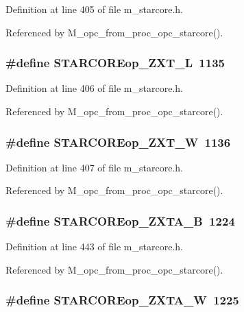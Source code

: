 Definition at line 405 of file m\_\-starcore.h.

Referenced by M\_\-opc\_\-from\_\-proc\_\-opc\_\-starcore().
\subsubsection{\setlength{\rightskip}{0pt plus 5cm}\#define STARCOREop\_\-ZXT\_\-L~1135}\label{m__starcore_8h_f1dd3e02a4b1e13b99f240635fd8c578}




Definition at line 406 of file m\_\-starcore.h.

Referenced by M\_\-opc\_\-from\_\-proc\_\-opc\_\-starcore().
\subsubsection{\setlength{\rightskip}{0pt plus 5cm}\#define STARCOREop\_\-ZXT\_\-W~1136}\label{m__starcore_8h_c6c2fffe83a8a1a00770e3c2f17e4b35}




Definition at line 407 of file m\_\-starcore.h.

Referenced by M\_\-opc\_\-from\_\-proc\_\-opc\_\-starcore().
\subsubsection{\setlength{\rightskip}{0pt plus 5cm}\#define STARCOREop\_\-ZXTA\_\-B~1224}\label{m__starcore_8h_f445e4a60c9e322609252ae171dd8e16}




Definition at line 443 of file m\_\-starcore.h.

Referenced by M\_\-opc\_\-from\_\-proc\_\-opc\_\-starcore().
\subsubsection{\setlength{\rightskip}{0pt plus 5cm}\#define STARCOREop\_\-ZXTA\_\-W~1225}\label{m__starcore_8h_2c3c7fd6ab4ed6397b6cf8cd5e324f75}




